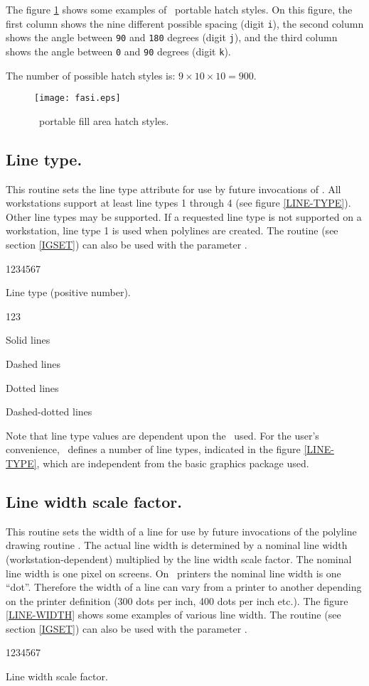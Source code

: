 The figure \ref{FILL-STY} shows some examples of \HIGZ~portable hatch styles.
On this figure, the first column shows the nine different possible spacing
(digit {\tt i}), the second column shows the angle between {\tt 90} and
{\tt 180} degrees (digit {\tt j}), and the third column shows the angle between
{\tt 0} and {\tt 90} degrees (digit {\tt k}).

The number of possible hatch styles is: $9\times10\times10=900$.
\begin{figure}[p]
\texttt{[image: fasi.eps]}
\caption{\HIGZ~portable fill area hatch styles.}
\label{FILL-STY}
\end{figure}
\clearpage
%
\subsection{Line type.}
\Action
This routine sets the line type attribute for use by future invocations of
. All workstations support at least line types 1 through 4
(see figure \ref{LINE-TYPE}). Other line types may be supported. If a requested
line type is not supported on a workstation, line type 1 is used when polylines
are created.
The routine  (see section \ref{IGSET}) can also be used with the
parameter .
\Pdesc
\begin{DLtt}{1234567}
\item[LTYPE] Line type (positive number).
\begin{DLtt}{123}
\item[1] Solid lines
\item[2] Dashed lines
\item[3] Dotted lines
\item[4] Dashed-dotted lines
\end{DLtt}
\end{DLtt}
\par
Note that line type values are dependent upon the \UGP~used. For the user's
convenience, \HIGZ~defines a number of line types, indicated in the figure
\ref{LINE-TYPE}, which are independent from the basic graphics package used.
%
\subsection{Line width scale factor.}
\Action
This routine sets the width of a line for use by future invocations of the
polyline drawing routine . The actual line width is determined by a
nominal line width (workstation-dependent) multiplied by the line width scale
factor. The nominal line width is one pixel on screens. On \PS~printers the
nominal line width is one ``dot''. Therefore the width of a line can vary from
a printer to another depending on the printer definition (300 dots per inch,
400 dots per inch etc.). The figure \ref{LINE-WIDTH} shows some examples of
various line width. The routine  (see section \ref{IGSET}) can also
be used with the parameter .
\Pdesc
\begin{DLtt}{1234567}
\item[WIDTH] Line width scale factor.
\end{DLtt}

